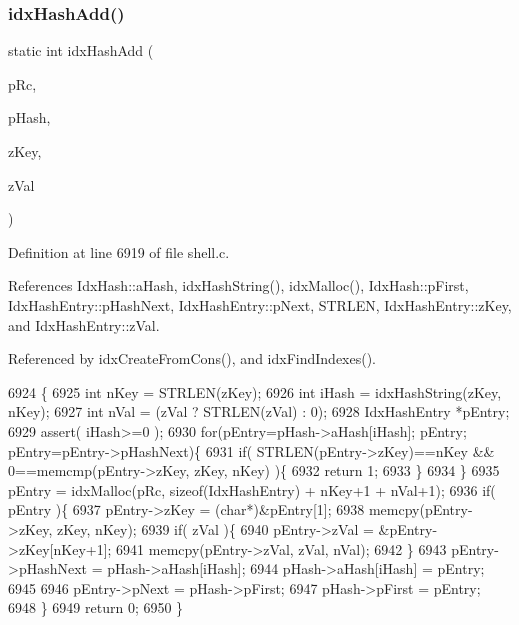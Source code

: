 \subsubsection{idx\+Hash\+Add()}
{\footnotesize\ttfamily static int idx\+Hash\+Add (\begin{DoxyParamCaption}\item[{int $\ast$}]{p\+Rc,  }\item[{\textbf{ Idx\+Hash} $\ast$}]{p\+Hash,  }\item[{const char $\ast$}]{z\+Key,  }\item[{const char $\ast$}]{z\+Val }\end{DoxyParamCaption})\hspace{0.3cm}{\ttfamily [static]}}



Definition at line 6919 of file shell.\+c.



References Idx\+Hash\+::a\+Hash, idx\+Hash\+String(), idx\+Malloc(), Idx\+Hash\+::p\+First, Idx\+Hash\+Entry\+::p\+Hash\+Next, Idx\+Hash\+Entry\+::p\+Next, S\+T\+R\+L\+EN, Idx\+Hash\+Entry\+::z\+Key, and Idx\+Hash\+Entry\+::z\+Val.



Referenced by idx\+Create\+From\+Cons(), and idx\+Find\+Indexes().


\begin{DoxyCode}
6924  \{
6925   \textcolor{keywordtype}{int} nKey = STRLEN(zKey);
6926   \textcolor{keywordtype}{int} iHash = idxHashString(zKey, nKey);
6927   \textcolor{keywordtype}{int} nVal = (zVal ? STRLEN(zVal) : 0);
6928   IdxHashEntry *pEntry;
6929   assert( iHash>=0 );
6930   \textcolor{keywordflow}{for}(pEntry=pHash->aHash[iHash]; pEntry; pEntry=pEntry->pHashNext)\{
6931     \textcolor{keywordflow}{if}( STRLEN(pEntry->zKey)==nKey && 0==memcmp(pEntry->zKey, zKey, nKey) )\{
6932       \textcolor{keywordflow}{return} 1;
6933     \}
6934   \}
6935   pEntry = idxMalloc(pRc, \textcolor{keyword}{sizeof}(IdxHashEntry) + nKey+1 + nVal+1);
6936   \textcolor{keywordflow}{if}( pEntry )\{
6937     pEntry->zKey = (\textcolor{keywordtype}{char}*)&pEntry[1];
6938     memcpy(pEntry->zKey, zKey, nKey);
6939     \textcolor{keywordflow}{if}( zVal )\{
6940       pEntry->zVal = &pEntry->zKey[nKey+1];
6941       memcpy(pEntry->zVal, zVal, nVal);
6942     \}
6943     pEntry->pHashNext = pHash->aHash[iHash];
6944     pHash->aHash[iHash] = pEntry;
6945 
6946     pEntry->pNext = pHash->pFirst;
6947     pHash->pFirst = pEntry;
6948   \}
6949   \textcolor{keywordflow}{return} 0;
6950 \}
\end{DoxyCode}
\mbox{\label{shell_8c_a3b64953059312e7fdbff75125a46d74d}} 
